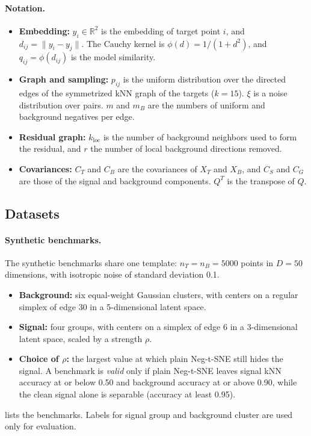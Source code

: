\documentclass[10pt]{article}
\newcommand{\T}{^{T}}
\newcommand{\R}{\mathbb{R}}
\newcommand{\kloc}{k_{\mathrm{loc}}}
\begin{document}
\paragraph{Notation.}
\begin{itemize}
  \item \textbf{Embedding:} $y_i \in \R^2$ is the embedding of target point $i$, and $d_{ij} = \|y_i - y_j\|$. The Cauchy kernel is $\phi(d) = 1/(1+d^2)$, and $q_{ij} = \phi(d_{ij})$ is the model similarity.
  \item \textbf{Graph and sampling:} $p_{ij}$ is the uniform distribution over the directed edges of the symmetrized kNN graph of the targets ($k = 15$). $\xi$ is a noise distribution over pairs. $m$ and $m_B$ are the numbers of uniform and background negatives per edge.
  \item \textbf{Residual graph:} $\kloc$ is the number of background neighbors used to form the residual, and $r$ the number of local background directions removed.
  \item \textbf{Covariances:} $C_T$ and $C_B$ are the covariances of $X_T$ and $X_B$, and $C_S$ and $C_G$ are those of the signal and background components. $Q\T$ is the transpose of $Q$.
\end{itemize}

\subsection{Datasets}
\label{sec:data}

\paragraph{Synthetic benchmarks.} The synthetic benchmarks share one template: $n_T = n_B = 5000$ points in $D = 50$ dimensions, with isotropic noise of standard deviation 0.1.
\begin{itemize}
  \item \textbf{Background:} six equal-weight Gaussian clusters, with centers on a regular simplex of edge 30 in a 5-dimensional latent space.
  \item \textbf{Signal:} four groups, with centers on a simplex of edge 6 in a 3-dimensional latent space, scaled by a strength $\rho$.
  \item \textbf{Choice of $\rho$:} the largest value at which plain Neg-t-SNE still hides the signal. A benchmark is \emph{valid} only if plain Neg-t-SNE leaves signal kNN accuracy at or below 0.50 and background accuracy at or above 0.90, while the clean signal alone is separable (accuracy at least 0.95).
\end{itemize}
 lists the benchmarks. Labels for signal group and background cluster are used only for evaluation.
\end{document}

